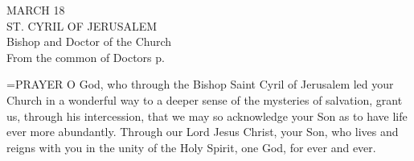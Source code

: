 \begin{center}\normalsize MARCH 18\\
\footnotesize ST. CYRIL OF JERUSALEM\\
\footnotesize Bishop and Doctor of the Church\\
\footnotesize From the common of Doctors p. \\
\end{center}

\hangindent=\parindent \small{PRAYER 
O God, who through the Bishop Saint Cyril of Jerusalem
led your Church in a wonderful way
to a deeper sense of the mysteries of salvation,
grant us, through his intercession,
that we may so acknowledge your Son
as to have life ever more abundantly.
Through our Lord Jesus Christ, your Son,
who lives and reigns with you in the unity of the Holy Spirit,
one God, for ever and ever.\\}
 
